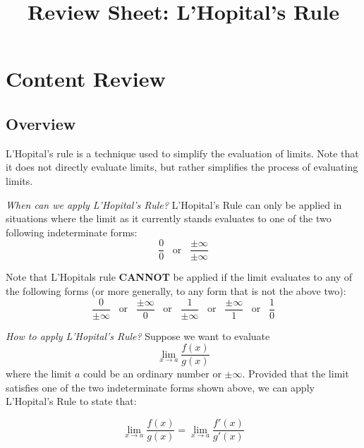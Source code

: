 \documentclass{article}
\title{Review Sheet: L'Hopital's Rule}
\date{}
\author{}
\begin{document}
\maketitle
\vspace{-0.75in}
\section*{Content Review}
\subsection*{Overview}

L'Hopital's rule is a technique used to simplify the evaluation of limits. Note that it does not directly evaluate limits, but rather simplifies the process of evaluating limits. 
\vspace{10pt
}

\noindent \textit{When can we apply L'Hopital's Rule?}
\newline L'Hopital's Rule can only be applied in situations where the limit as it currently stands evaluates to one of the two following indeterminate forms:
$$\frac{0}{0} \hspace{10pt} \text{or} \hspace{10pt} \frac{\pm \infty}{\pm \infty}$$

Note that L'Hopitals rule \textbf{CANNOT} be applied if the limit evaluates to any of the following forms (or more generally, to any form that is not the above two):
$$\frac{0}{\pm \infty} \hspace{10pt} \text{or} \hspace{10pt} \frac{\pm \infty}{0} \hspace{10pt} \text{or} \hspace{10pt} \frac{1}{\pm \infty} \hspace{10pt} \text{or} \hspace{10pt} \frac{\pm \infty}{1}  \hspace{10pt} \text{or} \hspace{10pt} \frac{1}{0}$$

\noindent \textit{How to apply L'Hopital's Rule?}
\newline Suppose we want to evaluate
$$\lim_{x \rightarrow a}\frac{f(x)}{g(x)}$$
where the limit $a$ could be an ordinary number or $\pm \infty$. Provided that the limit satisfies one of the two indeterminate forms shown above, we can apply L'Hopital's Rule to state that:

$$\lim_{x \rightarrow a}\frac{f(x)}{g(x)} = \lim_{x \rightarrow a}\frac{f'(x)}{g'(x)}$$
\end{document}
